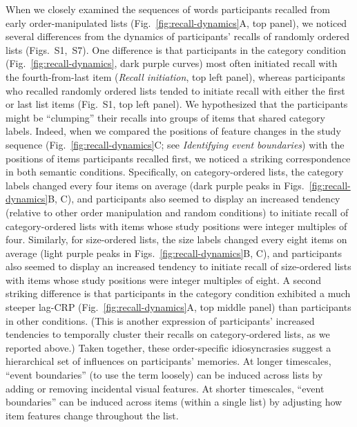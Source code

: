 \documentclass[11pt]{article}
\newcommand{\dynamicsRandom}{S1}
\newcommand{\recallInit}{S7}
\newcommand{\abbreviations}{S1}
\begin{document}
When we closely examined the sequences of words participants recalled from
early order-manipulated lists (Fig.~\ref{fig:recall-dynamics}A, top panel), we
noticed several differences from the dynamics of participants' recalls of
randomly ordered lists (Figs.~\dynamicsRandom,~\recallInit). One difference is
that participants in the category condition (Fig.~\ref{fig:recall-dynamics},
dark purple curves) most often initiated recall with the
fourth-from-last item (\textit{Recall initiation}, top left panel), whereas
participants who recalled randomly ordered lists tended to initiate recall with
either the first or last list items (Fig.~\dynamicsRandom, top left panel). We
hypothesized that the participants might be ``clumping'' their recalls into
groups of items that shared category labels. Indeed, when we compared the
positions of feature changes in the study sequence
(Fig.~\ref{fig:recall-dynamics}C; see \textit{Identifying event boundaries})
with the positions of items participants recalled first, we noticed a striking
correspondence in both semantic conditions. Specifically, on category-ordered
lists, the category labels changed every four items on average (dark purple
peaks in Figs.~\ref{fig:recall-dynamics}B, C), and participants also seemed to
display an increased tendency (relative to other order manipulation and random
conditions) to initiate recall of category-ordered lists with items whose study
positions were integer multiples of four. Similarly, for size-ordered lists,
the size labels changed every eight items on average (light purple peaks in
Figs.~\ref{fig:recall-dynamics}B, C), and participants also seemed to display an
increased tendency to initiate recall of size-ordered lists with items whose
study positions were integer multiples of eight. A second striking difference
is that participants in the category condition exhibited a much steeper lag-CRP
(Fig.~\ref{fig:recall-dynamics}A, top middle panel) than participants in other
conditions. (This is another expression of participants' increased tendencies
to temporally cluster their recalls on category-ordered lists, as we reported
above.) Taken together, these order-specific idiosyncrasies suggest a
hierarchical set of influences on participants' memories. At longer timescales,
``event boundaries'' (to use the term loosely) can be induced across lists by
adding or removing incidental visual features. At shorter timescales, ``event
boundaries'' can be induced across items (within a single list) by adjusting
how item features change throughout the list.

\begin{table}[tp]
\centering
\tiny

    
\caption{\textbf{Comparing accuracy on early lists in different order
manipulation conditions.} The independent samples $t$-tests reported in the
table were carried out across-participants, and reflect data aggregated across
all early lists from each participant. Abbreviations used in this table are
defined in Table~\abbreviations.}

\label{tab:order-accuracy-comparisons-early}
\end{table}
\end{document}

